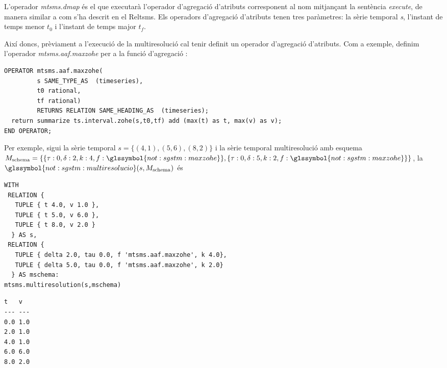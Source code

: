 {L'operador \emph{mtsms.dmap} és el que executarà l'operador
d'agregació d'atributs corresponent al nom mitjançant la sentència
\emph{execute}, de manera similar a com s'ha descrit en el Reltsms.
Els operadors d'agregació d'atributs tenen tres paràmetres: la sèrie
temporal \emph{s}, l'instant de temps menor $t_0$ i l'instant de temps
major $t_f$.

Així doncs, prèviament a l'execució de la multiresolució cal tenir
definit un operador d'agregació d'atributs. Com a exemple, definim
l'operador \emph{mtsms.aaf.maxzohe} per a la funció d'agregació
:
\begin{lstlisting}[style=tutorialD]
OPERATOR mtsms.aaf.maxzohe(
         s SAME_TYPE_AS  (timeseries), 
         t0 rational, 
         tf rational)        
         RETURNS RELATION SAME_HEADING_AS  (timeseries);
  return summarize ts.interval.zohe(s,t0,tf) add (max(t) as t, max(v) as v);
END OPERATOR;
\end{lstlisting}


Per exemple, sigui la sèrie temporal $s=\{(4,1),(5,6),(8,2)\}$ i la
sèrie temporal multiresolució amb esquema $ M_{\text{schema}} = \{ \{
\tau : 0, \delta : 2, k: 4, f : \glssymbol{not:sgstm:maxzohe} \} , \{
\tau : 0, \delta : 5, k: 2, f :\glssymbol{not:sgstm:maxzohe} \} \}$,
la $\glssymbol{not:sgstm:multiresolucio}(s,M_{\text{schema}})$ és


\begin{lstlisting}[style=tutorialD]
WITH 
 RELATION {
   TUPLE { t 4.0, v 1.0 },
   TUPLE { t 5.0, v 6.0 },
   TUPLE { t 8.0, v 2.0 }
  } AS s,
 RELATION {
   TUPLE { delta 2.0, tau 0.0, f 'mtsms.aaf.maxzohe', k 4.0},
   TUPLE { delta 5.0, tau 0.0, f 'mtsms.aaf.maxzohe', k 2.0}
  } AS mschema:
mtsms.multiresolution(s,mschema)
\end{lstlisting}
\begin{lstlisting}[style=stdout]
 t   v 
--- ---
0.0 1.0
2.0 1.0
4.0 1.0
6.0 6.0
8.0 2.0
\end{lstlisting}










}
